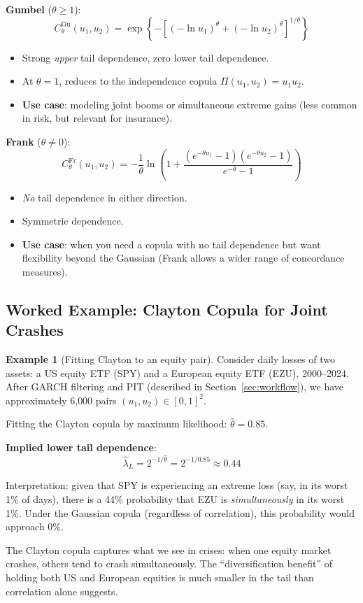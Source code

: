 \documentclass[11pt, a4paper]{article}
\theoremstyle{definition}
\newtheorem{example}{Example}[section]
\theoremstyle{plain}
\theoremstyle{remark}
\begin{document}
\textbf{Gumbel} ($\theta \geq 1$):
\[
    C_\theta^{\text{Gu}}(u_1, u_2) = \exp\!\left\{-\left[(-\ln u_1)^\theta + (-\ln u_2)^\theta\right]^{1/\theta}\right\}
\]
\begin{itemize}
    \item Strong \emph{upper} tail dependence, zero lower tail dependence.
    \item At $\theta = 1$, reduces to the independence copula $\Pi(u_1, u_2) = u_1 u_2$.
    \item \textbf{Use case}: modeling joint booms or simultaneous extreme gains (less common in risk, but relevant for insurance).
\end{itemize}

\textbf{Frank} ($\theta \neq 0$):
\[
    C_\theta^{\text{Fr}}(u_1, u_2) = -\frac{1}{\theta}\ln\!\left(1 + \frac{(e^{-\theta u_1} - 1)(e^{-\theta u_2} - 1)}{e^{-\theta} - 1}\right)
\]
\begin{itemize}
    \item \emph{No} tail dependence in either direction.
    \item Symmetric dependence.
    \item \textbf{Use case}: when you need a copula with no tail dependence but want flexibility
          beyond the Gaussian (Frank allows a wider range of concordance measures).
\end{itemize}

\subsection{Worked Example: Clayton Copula for Joint Crashes}

\begin{example}[Fitting Clayton to an equity pair]\label{ex:clayton}
Consider daily losses of two assets: a US equity ETF (SPY) and a European equity ETF (EZU), 2000--2024.
After GARCH filtering and PIT (described in Section~\ref{sec:workflow}),
we have approximately 6{,}000 pairs $(u_1, u_2) \in [0,1]^2$.

Fitting the Clayton copula by maximum likelihood:
$\hat\theta = 0.85$.

\textbf{Implied lower tail dependence}:
\[
    \hat\lambda_L = 2^{-1/\hat\theta} = 2^{-1/0.85} \approx 0.44
\]

Interpretation: given that SPY is experiencing an extreme loss
(say, in its worst 1\% of days), there is a 44\% probability that EZU
is \emph{simultaneously} in its worst 1\%.
Under the Gaussian copula (regardless of correlation), this probability would approach 0\%.

The Clayton copula captures what we see in crises:
when one equity market crashes, others tend to crash simultaneously.
The ``diversification benefit'' of holding both US and European equities is much smaller
in the tail than correlation alone suggests.
\end{example}
\end{document}
